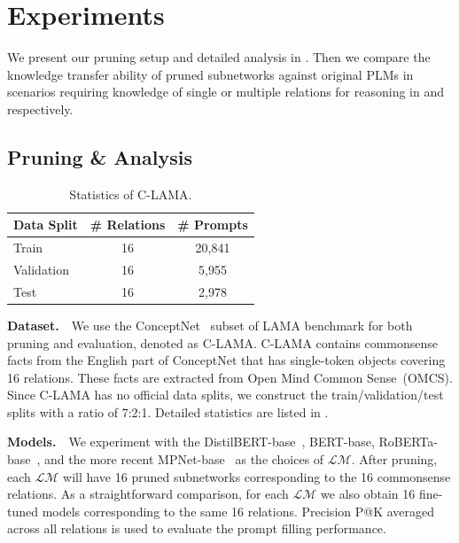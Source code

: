 
\section{Experiments}
We present our pruning setup and detailed analysis in . Then we compare the knowledge transfer ability of pruned subnetworks against original PLMs in scenarios requiring knowledge of single or multiple relations for reasoning in  and  respectively.

\subsection{Pruning \& Analysis}
\label{sec:LAMA}
\begin{table}[!h]
	\centering
	\small
	\begin{tabular}{l|cc}
		\toprule
		\textbf{Data Split} & \textbf{\# Relations} & \textbf{\# Prompts} \\
		\midrule
		Train  & 16 &  20,841\\
		Validation   & 16 &  5,955\\
		Test   & 16 &  2,978\\
		\bottomrule
	\end{tabular}
	\caption{Statistics of C-LAMA.}
	\label{table:conceptnet}
\end{table}
\noindent
\textbf{Dataset.}~~We use the ConceptNet~\citep{speer-havasi-2012-representing} subset of LAMA benchmark for both pruning and evaluation, denoted as C-LAMA.
C-LAMA contains commonsense facts from the English part of ConceptNet that has
single-token objects covering 16 relations. 
These facts are extracted from Open Mind Common Sense~(OMCS). 
Since C-LAMA has no official data splits, we construct the train/validation/test splits with 
a ratio of 7:2:1. Detailed statistics are listed in . 


\noindent
\textbf{Models.}~~We experiment with the DistilBERT-base~\citep{DBLP:journals/corr/abs-1910-01108}, BERT-base, RoBERTa-base~\citep{DBLP:journals/corr/abs-1907-11692}, and the more recent MPNet-base~\citep{song2020mpnet} as the choices of $\mathcal{LM}$. After pruning, each $\mathcal{LM}$ will have 16 pruned subnetworks corresponding to the 16 commonsense relations. As a straightforward comparison, for each $\mathcal{LM}$ we also obtain 16 fine-tuned models corresponding to the same 16 relations. Precision P@K averaged across all relations is used to evaluate the prompt filling performance. 


